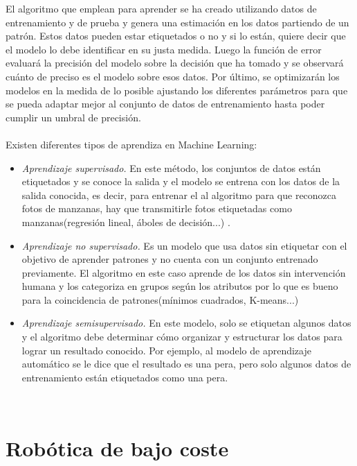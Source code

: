 El algoritmo que emplean para aprender se ha creado utilizando datos de entrenamiento y de prueba y genera una estimación en los datos partiendo de un patrón. Estos datos pueden estar etiquetados o no y si lo están, quiere decir que el modelo lo debe identificar en su justa medida. Luego la función de error evaluará la precisión del modelo sobre la decisión que ha tomado y se observará cuánto de preciso es el modelo sobre esos datos. Por último, se optimizarán los modelos en la medida de lo posible ajustando los diferentes parámetros para que se pueda adaptar mejor al conjunto de datos de entrenamiento hasta poder cumplir un umbral de precisión.\\ \\



Existen diferentes tipos de aprendiza en Machine Learning: 

\begin{itemize}
 \item \textit{Aprendizaje supervisado.} En este método, los conjuntos de datos están etiquetados y se conoce la salida y el modelo se entrena con los datos de la salida conocida, es decir, para entrenar el al algoritmo para que reconozca fotos de manzanas, hay que transmitirle fotos etiquetadas como manzanas(regresión lineal, áboles de decisión...) .
 \item \textit{Aprendizaje no supervisado.} Es un modelo que usa datos sin etiquetar con el objetivo de aprender patrones y no cuenta con un conjunto entrenado previamente. El algoritmo en este caso aprende de los datos sin intervención humana y los categoriza en grupos según los atributos por lo que es bueno para la coincidencia de patrones(mínimos cuadrados, K-means...)
 \item \textit{Aprendizaje semisupervisado.} En este modelo, solo se etiquetan algunos datos y el algoritmo debe determinar cómo organizar y estructurar los datos para lograr un resultado conocido. Por ejemplo, al modelo de aprendizaje automático se le dice que el resultado es una pera, pero solo algunos datos de entrenamiento están etiquetados como una pera.
\end{itemize}\


 
\label{sec:cuartaseccion}


\section{Robótica de bajo coste}
\label{sec:quintaseccion}

